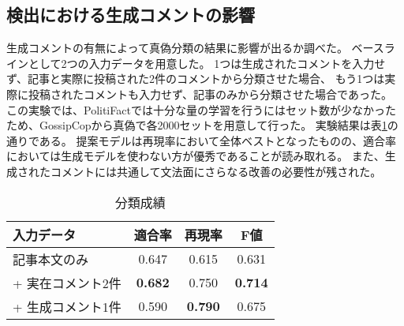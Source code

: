 \subsection{検出における生成コメントの影響}
生成コメントの有無によって真偽分類の結果に影響が出るか調べた。
ベースラインとして2つの入力データを用意した。
1つは生成されたコメントを入力せず、記事と実際に投稿された2件のコメントから分類させた場合、
もう1つは実際に投稿されたコメントも入力せず、記事のみから分類させた場合であった。
この実験では、PolitiFactでは十分な量の学習を行うにはセット数が少なかったため、GossipCopから真偽で各2000セットを用意して行った。
実験結果は表\ref{tbl:classify_results}の通りである。
提案モデルは再現率において全体ベストとなったものの、適合率においては生成モデルを使わない方が優秀であることが読み取れる。
また、生成されたコメントには共通して文法面にさらなる改善の必要性が残された。

\begin{table}[!t]
    \renewcommand{\arraystretch}{1.3}
    \caption{分類成績}
    \label{tbl:classify_results}
    \centering
    \begin{tabular}{lccc}
        \hline
        入力データ           & 適合率 & 再現率 & F値 \\ \hline
        記事本文のみ         & 0.647     & 0.615  & 0.631    \\
        + 実在コメント2件  & \textbf{0.682}     & 0.750  & \textbf{0.714}    \\
        + 生成コメント1件 & 0.590     & \textbf{0.790}  & 0.675    \\ \hline
    \end{tabular}
\end{table}
